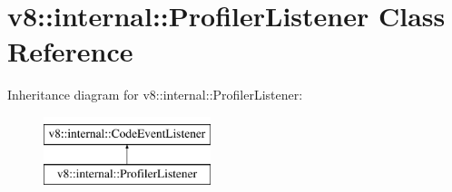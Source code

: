 \hypertarget{classv8_1_1internal_1_1ProfilerListener}{}\section{v8\+:\+:internal\+:\+:Profiler\+Listener Class Reference}
\label{classv8_1_1internal_1_1ProfilerListener}
Inheritance diagram for v8\+:\+:internal\+:\+:Profiler\+Listener\+:\begin{figure}[H]
\begin{center}
\leavevmode
\includegraphics[height=2.000000cm]{classv8_1_1internal_1_1ProfilerListener}
\end{center}
\end{figure}
